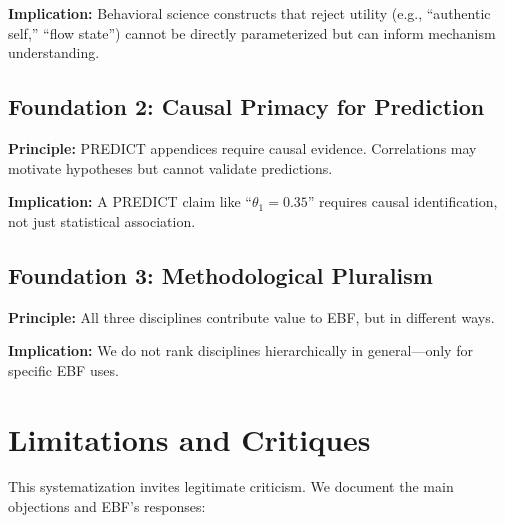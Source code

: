 \documentclass[11pt, a4paper]{article}
\begin{document}
\textbf{Implication:} Behavioral science constructs that reject utility (e.g., ``authentic self,'' ``flow state'') cannot be directly parameterized but can inform mechanism understanding.

\subsection{Foundation 2: Causal Primacy for Prediction}

\textbf{Principle:} PREDICT appendices require causal evidence. Correlations may motivate hypotheses but cannot validate predictions.

\textbf{Implication:} A PREDICT claim like ``$\theta_1 = 0.35$'' requires causal identification, not just statistical association.

\subsection{Foundation 3: Methodological Pluralism}

\textbf{Principle:} All three disciplines contribute value to EBF, but in different ways.

\textbf{Implication:} We do not rank disciplines hierarchically in general---only for specific EBF uses.


\section{Limitations and Critiques}
\label{sec:evd-critiques}

This systematization invites legitimate criticism. We document the main objections and EBF's responses:
\end{document}
